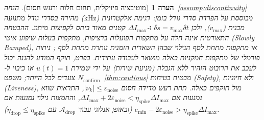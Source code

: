 \documentclass[10pt, a4paper, twocolumn]{article}
\newtheorem{remark}{הערה}
\begin{document}
\begin{remark}[מוטיבציה פיזיקלית, תחום חלות ורעש חסום]
הנחה~\ref{assump:discontinuity} מבוססת על הפרדת סדרי גודל בזמן: דגימה אלקטרונית ($\text{kHz}$) מהירה בסדרי גודל מתנועה מכנית ($v_{\max}$), ולכן $\delta s = v_{\max}\delta t$ ו-$\Delta I_{\max}$ קטנים מאוד ביחס לקפיצות מיתוג. ההבטחה התאורטית אינה חלה על מתקפות הפועלות ברציפות, מתקפות בעלות שיפוע איטי (\foreignlanguage{english}{Slowly Ramped}), או מתקפות מתחת לסף הגילוי שבהן השארית הזמנית נותרת מתחת לסף \cite{psiaki2016gnss}; ניתוח פורמלי של מתקפות חמקניות כאלה מושאר לעבודה עתידית. בפרט, תוקף המודע להגנה יכול לעכב את הרובוט הזהיר ללא הגבלה (מניעת שירות) על ידי שמירת $u(t)=1$ או כיבוי ל-$N_{\text{confirm}}$ צעדים לכל היותר; משפט~\ref{thm:cautious} מבטיח בטיחות (\foreignlanguage{english}{Safety}), ולא חיוניות (\foreignlanguage{english}{Liveness}), מול תוקפים כאלה. תחת רעש מדידה חסום $|\nu_k| \le \varepsilon_{\text{noise}}$, התראות שווא נמנעות אם $\Delta I_{\max} + 2\varepsilon_{\text{noise}} < \eta_{\text{spike}}\Delta I_{\max}$, והחמצות גילוי נמנעות אם $e_{\min} - 2\varepsilon_{\text{noise}} > \eta_{\text{spike}}\Delta I_{\max}$ (ובאופן אנלוגי עבור $\mathcal{A}_{\text{drop}}$ עם $\eta_{\text{drop}} \le \eta_{\text{spike}}$).
\end{remark}
\end{document}
